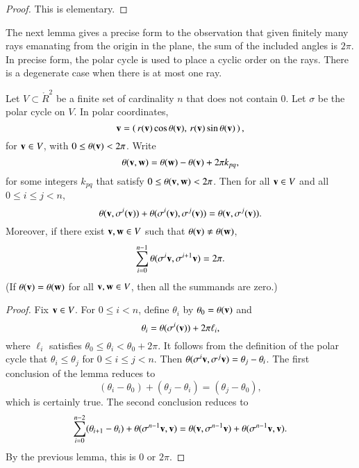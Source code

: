 \begin{proof} This is elementary.
\end{proof}

The next lemma gives a precise form to the observation
that given finitely many rays emanating from the origin
in the plane, the sum of the included angles is $2\pi$.
In precise form, the polar cycle is used to place
a cyclic order on the rays.  There is a degenerate case
when there is at most one ray.


\begin{lemma}\label{lemma:polar-sum}
Let $V\subset\ring{R}^2$ be a finite set
of cardinality $n$ that does not contain $0$.
Let $\sigma$ be the polar cycle on $V$.  
In polar coordinates,
\begin{displaymath}{\mathbf v}=\left(\, r({\mathbf v})\cos\theta({\mathbf v}),\, r({\mathbf v})\sin\theta({\mathbf v})\,\right),\end{displaymath} 
for ${\mathbf v}\in V$, with
$0\le\theta({\mathbf v})<2\pi$.
Write
   \begin{displaymath}
   \theta({\mathbf v},{\mathbf w}) = \theta({\mathbf w}) - \theta({\mathbf v}) + 2\pi k_{pq},
   \end{displaymath}
for some integers $k_{pq}$ that satisfy $0\le \theta({\mathbf v},{\mathbf w}) < 2\pi$.
Then for all ${\mathbf v}\in V$
and all $0\le i \le j < n$,
   \begin{displaymath}
   \theta({\mathbf v},\sigma^i({\mathbf v})) +\theta(\sigma^i({\mathbf v}),\sigma^j({\mathbf v})) =
   \theta({\mathbf v},\sigma^j({\mathbf v})).
   \end{displaymath}
Moreover, if there exist ${\mathbf v},{\mathbf w}\in V$ such that $\theta({\mathbf v})\ne\theta({\mathbf w})$,
  \begin{displaymath}
  \sum_{i=0}^{n-1} \theta(\sigma^{i}{\mathbf v},\sigma^{i+1} {\mathbf v}) = 2\pi.
  \end{displaymath}
(If $\theta({\mathbf v})=\theta({\mathbf w})$ for all ${\mathbf v},{\mathbf w}\in V$, then all the
summands are zero.)
\end{lemma}
%

\begin{proof}
Fix ${\mathbf v}\in V$.
For $0\le i<n$, define $\theta_i$ by
   $\theta_0=\theta({\mathbf v})$ and 
   \begin{displaymath}\theta_i = \theta(\sigma^i({\mathbf v})) + 2\pi \ell_i,\end{displaymath}
where  $\ell_i$ satisfies $\theta_0\le \theta_i < \theta_0+2\pi$.
It follows from the definition of the polar cycle that
$\theta_i \le \theta_j$ for $0\le i\le j < n$.  Then
$\theta(\sigma^i {\mathbf v} ,\sigma^j {\mathbf v}) = \theta_j - \theta_i$.
The first conclusion of the lemma reduces to
  \begin{displaymath}
  (\theta_i-\theta_0) + (\theta_j-\theta_i) = (\theta_j-\theta_0),
  \end{displaymath}
which is certainly true.
The second conclusion reduces to
  \begin{displaymath}
  \sum_{i=0}^{n-2} (\theta_{i+1}-\theta_i) + \theta(\sigma^{n-1}{\mathbf v},{\mathbf v})
  = \theta({\mathbf v},\sigma^{n-1}{\mathbf v}) + \theta(\sigma^{n-1}{\mathbf v},{\mathbf v}).
  \end{displaymath}
By the previous lemma, this is $0$ or $2\pi$.
\end{proof}


